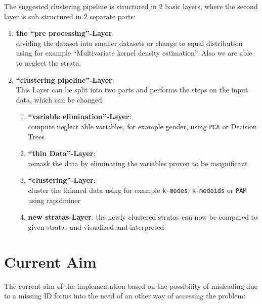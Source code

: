\documentclass{article}
\begin{document}
	The suggested clustering pipeline is structured in 2 basic layers, where the second layer is sub structured in 2 separate parts:
	\begin{enumerate}
		\item \textbf{the ``pre processing''-Layer}:\\
			dividing the dataset into smaller datasets or change to equal distribution using for example ``Multivariate kernel density estimation''. Also we are able to neglect the strata.
		\item \textbf{``clustering pipeline''-Layer}:\\
			This Layer can be split into two parts and performs the steps on the input data, which can be changed 
			\begin{enumerate}[label=2.\arabic*.]
				\item \textbf{``variable elimination''-Layer}:\\
					compute neglect able variables, for example gender, using \texttt{PCA} or Decision Trees
				\item \textbf{``thin Data''-Layer}:\\
					remask the data by eliminating the variables proven to be insignificant
				\item \textbf{``clustering''-Layer}:\\
					cluster the thinned data using for example \texttt{k-modes}, \texttt{k-medoids} or \texttt{PAM} using rapidminer
				\item \textbf{new stratas-Layer}:
					the newly clustered stratas can now be compared to given stratas and visualized and interpreted
			\end{enumerate}				
	\end{enumerate}

\section{Current Aim}
	The current aim of the implementation based on the possibility of misleading due to a missing ID forms into the need of an other way of accessing the problem:
	
\end{document}
